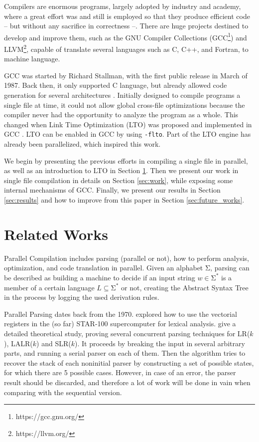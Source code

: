 \documentclass[runningheads]{llncs}
\begin{document}
Compilers are enormous programs, largely adopted by industry and academy, where
a great effort was and still is employed so that they produce efficient code --
but without any sacrifice in correctness --. There are huge projects destined
to develop and improve them, such as the GNU Compiler Collections
(GCC\footnote{https://gcc.gnu.org/}) and LLVM\footnote{https://llvm.org/}, capable
of translate several languages such as C, C++, and Fortran, to machine language.

GCC was started by Richard Stallman, with the first public release in March of
1987. Back then, it
only supported C language, but already allowed code generation for several
architectures \cite{gcc-first-ver}. Initially designed to compile programs a
single file at time, it could not allow global cross-file optimizations because
the compiler never had the opportunity to analyze the program as a whole. This
changed when Link Time Optimization (LTO) was proposed \cite{whoprgoogle} and
implemented in GCC \cite{glek2010optimizing}. LTO can be enabled in GCC by
using \texttt{-flto}. Part of the LTO engine has already been parallelized,
which inspired this work.

We begin by presenting the previous efforts in compiling a single file in
parallel, as well as an introduction to LTO in Section \ref{sec:related}.
Then we present our work in single file compilation in details on
Section \ref{sec:work}, while exposing some internal mechanisms
of GCC. Finally, we present our results in Section \ref{sec:results} and
how to improve from this paper in Section \ref{sec:future_works}.

\section{Related Works} \label{sec:related}

Parallel Compilation includes parsing (parallel or not),
how to perform analysis, optimization, and code translation in parallel.
Given an alphabet $\mathrm{\Sigma}$, parsing can be described as building a machine to decide if
an input string $w \in \mathrm{\Sigma}^*$ is a member of a certain language $L
\subseteq \mathrm{\Sigma}^*$ or not, creating the Abstract Syntax Tree in the
process by logging the used derivation rules.

Parallel Parsing dates back from the 1970. \cite{Lincoln:1970:PPT:987475.987478}
explored how to use the vectorial registers in the (so far)
STAR-100 supercomputer for lexical analysis.
\cite{fischer1975parsing} give a detailed theoretical study, proving
several concurrent parsing techniques for LR($k$), LALR($k$) and SLR($k$).
It proceeds by breaking the input in several arbitrary parts, and running a
serial parser on each of them. Then the algorithm tries to
recover the stack of each noninitial parser by constructing a set of
possible states, for which there are 5 possible cases. However, in case
of an error, the parser result should be discarded, and therefore a lot
of work will be done in vain when comparing with the sequential version.
\end{document}
